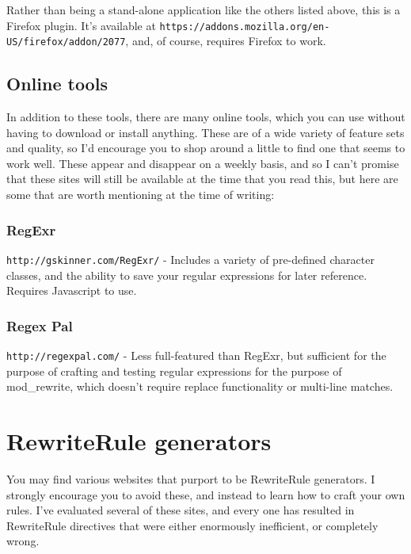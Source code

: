 Rather than being a stand-alone application like the others listed
above, this is a Firefox plugin. It's available at
\verb#https://addons.mozilla.org/en-US/firefox/addon/2077#, and, of
course, requires Firefox to work.

\subsection{Online tools}

In addition to these tools, there are many online tools, which you can
use without having to download or install anything. These are of a wide
variety of feature sets and quality, so I'd encourage you to shop around
a little to find one that seems to work well. These appear and disappear
on a weekly basis, and so I can't promise that these sites will still
be available at the time that you read this, but here are some that are
worth mentioning at the time of writing:

\subsubsection{RegExr}

\verb#http://gskinner.com/RegExr/# - Includes a variety of pre-defined
character classes, and the ability to save your regular expressions for
later reference. Requires Javascript to use.

\subsubsection{Regex Pal}



\verb#http://regexpal.com/# - Less full-featured than RegExr, but
sufficient for the purpose of crafting and testing regular expressions
for the purpose of mod\_rewrite, which doesn't require replace
functionality or multi-line matches.

\section{RewriteRule generators}

You may find various websites that purport to be RewriteRule generators.
I strongly encourage you to avoid these, and instead to learn how to
craft your own rules. I've evaluated several of these sites, and every
one has resulted in RewriteRule directives that were either enormously
inefficient, or completely wrong.

